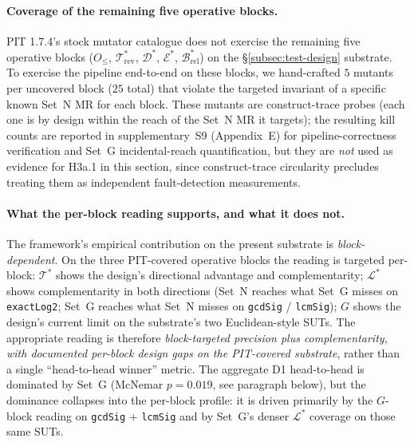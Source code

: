 \documentclass[acmsmall, screen]{acmart}
\begin{document}
\paragraph{Coverage of the remaining five operative blocks.}
\label{para:augmented-stratum-pointer}
PIT 1.7.4's stock mutator catalogue does not exercise the remaining
five operative blocks ($O_{\le}$, $\mathcal{T}^{*}_{\mathrm{rev}}$,
$\mathcal{D}^{*}$, $\mathcal{E}^{*}$,
$\mathcal{B}^{*}_{\mathrm{rel}}$) on the
\S\ref{subsec:test-design} substrate. To exercise the pipeline
end-to-end on these blocks, we hand-crafted $5$ mutants per
uncovered block ($25$ total) that violate the targeted invariant of
a specific known Set~N MR for each block. These mutants are
construct-trace probes (each one is by design within the reach of
the Set~N MR it targets); the resulting kill counts are reported in
supplementary~S9 (Appendix~E) for pipeline-correctness
verification and Set~G incidental-reach quantification, but they are
\emph{not} used as evidence for H3a.1 in this section, since
construct-trace circularity precludes treating them as independent
fault-detection measurements.

\paragraph{What the per-block reading supports, and what it does not.}
The framework's empirical contribution on the present substrate is
\emph{block-dependent}. On the three PIT-covered operative blocks
the reading is targeted per-block: $\mathcal{T}^{*}$ shows the
design's directional advantage and complementarity; $\mathcal{L}^{*}$
shows complementarity in both directions (Set~N reaches what Set~G
misses on \texttt{exactLog2}; Set~G reaches what Set~N misses on
\texttt{gcdSig} / \texttt{lcmSig}); $G$ shows the design's current
limit on the substrate's two Euclidean-style SUTs. The appropriate
reading is therefore \emph{block-targeted precision plus
complementarity, with documented per-block design gaps on the
PIT-covered substrate}, rather than a single ``head-to-head winner''
metric. The aggregate D1 head-to-head is dominated by Set~G
(McNemar $p = 0.019$, see paragraph below), but the dominance
collapses into the per-block profile: it is driven primarily by the
$G$-block reading on \texttt{gcdSig} + \texttt{lcmSig} and by Set~G's
denser $\mathcal{L}^{*}$ coverage on those same SUTs.
\end{document}
